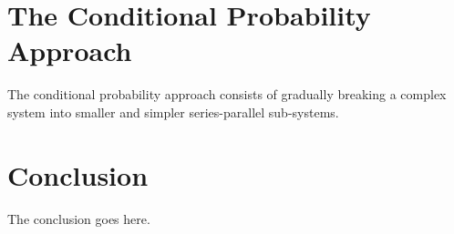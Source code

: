 \documentclass[conference]{IEEEtran}
\begin{document}
\section{The Conditional Probability Approach}
The conditional probability approach consists of gradually breaking a complex
system into smaller and simpler series-parallel sub-systems.



\section{Conclusion}
The conclusion goes here.


\end{document}
